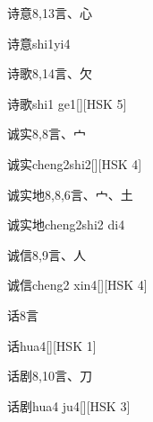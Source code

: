\begin{entry}{诗意}{8,13}{⾔、⼼}
  \begin{phonetics}{诗意}{shi1yi4}
  \end{phonetics}
\end{entry}

\begin{entry}{诗歌}{8,14}{⾔、⽋}
  \begin{phonetics}{诗歌}{shi1 ge1}[][HSK 5]
  \end{phonetics}
\end{entry}

\begin{entry}{诚实}{8,8}{⾔、⼧}
  \begin{phonetics}{诚实}{cheng2shi2}[][HSK 4]
  \end{phonetics}
\end{entry}

\begin{entry}{诚实地}{8,8,6}{⾔、⼧、⼟}
  \begin{phonetics}{诚实地}{cheng2shi2 di4}
  \end{phonetics}
\end{entry}

\begin{entry}{诚信}{8,9}{⾔、⼈}
  \begin{phonetics}{诚信}{cheng2 xin4}[][HSK 4]
  \end{phonetics}
\end{entry}

\begin{entry}{话}{8}{⾔}
  \begin{phonetics}{话}{hua4}[][HSK 1]
  \end{phonetics}
\end{entry}

\begin{entry}{话剧}{8,10}{⾔、⼑}
  \begin{phonetics}{话剧}{hua4 ju4}[][HSK 3]
  \end{phonetics}
\end{entry}

